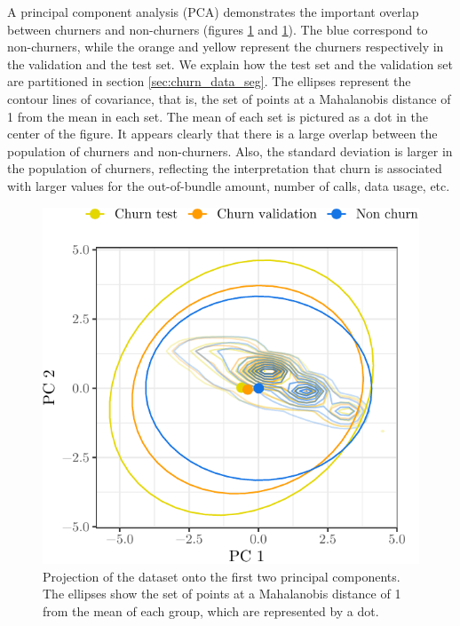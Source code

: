 A principal component analysis (PCA) demonstrates the important overlap between
churners and non-churners (figures \ref{fig:pca_1_2} and \ref{fig:pca_1_2}). The
blue correspond to non-churners, while the orange and yellow represent
the churners respectively in the validation and the test set. We explain how the
test set and the validation set are partitioned in section
\ref{sec:churn_data_seg}. The ellipses represent the contour lines of
covariance, that is, the set of points at a Mahalanobis distance of 1 from the
mean in each set. The mean of each set is pictured as a dot in the center of the
figure. It appears clearly that there is a large overlap between the population
of churners and non-churners. Also, the standard deviation is larger in the
population of churners, reflecting the interpretation that churn is associated
with larger values for the out-of-bundle amount, number of calls, data usage,
etc.

\begin{figure}
    \centering
    \includegraphics[width=0.63\linewidth]{figures/pca_1_2.pdf}
    \caption{Projection of the dataset onto the first two principal components.
    The ellipses show the set of points at a Mahalanobis distance of 1 from the
    mean of each group, which are represented by a dot.}
    \label{fig:pca_1_2}
\end{figure}

